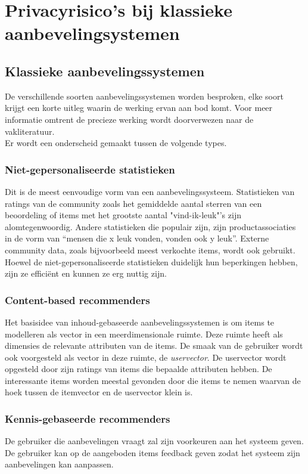 \chapter{Privacyrisico's bij klassieke aanbevelingsystemen}
\label{privacyklassiek}

\section{Klassieke aanbevelingssystemen}
\label{sec:klassiek}
De verschillende soorten aanbevelingssystemen worden besproken, elke soort krijgt een korte uitleg waarin de werking ervan aan bod komt. Voor meer informatie omtrent de precieze werking wordt doorverwezen naar de vakliteratuur. \\Er wordt een onderscheid gemaakt tussen de volgende types.
\subsection{Niet-gepersonaliseerde statistieken}
Dit is de meest eenvoudige vorm van een aanbevelingssysteem. Statistieken van ratings van de community zoals het gemiddelde aantal sterren van een beoordeling of items met het grootste aantal "vind-ik-leuk"'s zijn alomtegenwoordig. Andere statistieken die populair zijn, zijn productassociaties in de vorm van “mensen die x leuk vonden, vonden ook y leuk”. Externe community data, zoals bijvoorbeeld meest verkochte items, wordt ook gebruikt. Hoewel de niet-gepersonaliseerde statistieken duidelijk hun beperkingen hebben, zijn ze effici\"ent en kunnen ze erg nuttig zijn. 
\subsection{Content-based recommenders}
Het basisidee van inhoud-gebaseerde aanbevelingssystemen is om items te modelleren als vector in een meerdimensionale ruimte. Deze ruimte heeft als dimensies de relevante attributen van de items. De smaak van de gebruiker wordt ook voorgesteld als vector in deze ruimte, de \textit{uservector}. De uservector wordt opgesteld door zijn ratings van items die bepaalde attributen hebben. De interessante items worden meestal gevonden door die items te nemen waarvan de hoek tussen de itemvector en de uservector klein is. 
\subsection{Kennis-gebaseerde recommenders}
De gebruiker die aanbevelingen vraagt zal zijn voorkeuren aan het systeem geven. De gebruiker kan op de aangeboden items feedback geven zodat het systeem zijn aanbevelingen kan aanpassen.
